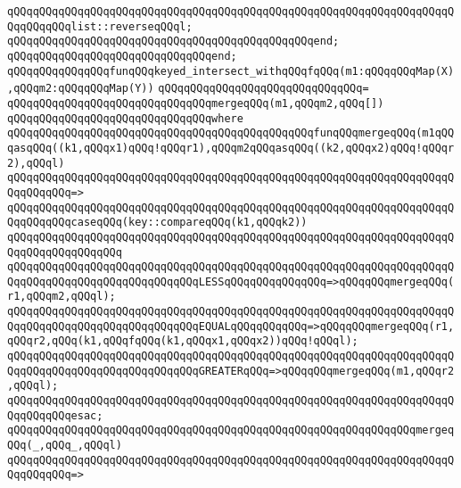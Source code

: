 \verb|qQQqqQQqqQQqqQQqqQQqqQQqqQQqqQQqqQQqqQQqqQQqqQQqqQQqqQQqqQQqqQQqqQQqqQQqqQQqqQQqlist::reverseqQQql;|\newline
\verb|qQQqqQQqqQQqqQQqqQQqqQQqqQQqqQQqqQQqqQQqqQQqqQQqend;|\newline
\verb|qQQqqQQqqQQqqQQqqQQqqQQqqQQqqQQqend;|\newline
\newline
\verb|qQQqqQQqqQQqqQQqfunqQQqkeyed_intersect_withqQQqfqQQq(m1:qQQqqQQqMap(X),qQQqm2:qQQqqQQqMap(Y))|\newline
\verb|qQQqqQQqqQQqqQQqqQQqqQQqqQQqqQQq=|\newline
\verb|qQQqqQQqqQQqqQQqqQQqqQQqqQQqqQQqmergeqQQq(m1,qQQqm2,qQQq[])|\newline
\verb|qQQqqQQqqQQqqQQqqQQqqQQqqQQqqQQqwhere|\newline
\verb|qQQqqQQqqQQqqQQqqQQqqQQqqQQqqQQqqQQqqQQqqQQqqQQqfunqQQqmergeqQQq(m1qQQqasqQQq((k1,qQQqx1)qQQq!qQQqr1),qQQqm2qQQqasqQQq((k2,qQQqx2)qQQq!qQQqr2),qQQql)|\newline
\verb|qQQqqQQqqQQqqQQqqQQqqQQqqQQqqQQqqQQqqQQqqQQqqQQqqQQqqQQqqQQqqQQqqQQqqQQqqQQqqQQq=>|\newline
\verb|qQQqqQQqqQQqqQQqqQQqqQQqqQQqqQQqqQQqqQQqqQQqqQQqqQQqqQQqqQQqqQQqqQQqqQQqqQQqqQQqcaseqQQq(key::compareqQQq(k1,qQQqk2))|\newline
\verb|qQQqqQQqqQQqqQQqqQQqqQQqqQQqqQQqqQQqqQQqqQQqqQQqqQQqqQQqqQQqqQQqqQQqqQQqqQQqqQQqqQQqqQQq|\newline
\verb|qQQqqQQqqQQqqQQqqQQqqQQqqQQqqQQqqQQqqQQqqQQqqQQqqQQqqQQqqQQqqQQqqQQqqQQqqQQqqQQqqQQqqQQqqQQqqQQqqQQqLESSqQQqqQQqqQQqqQQq=>qQQqqQQqmergeqQQq(r1,qQQqm2,qQQql);|\newline
\verb|qQQqqQQqqQQqqQQqqQQqqQQqqQQqqQQqqQQqqQQqqQQqqQQqqQQqqQQqqQQqqQQqqQQqqQQqqQQqqQQqqQQqqQQqqQQqqQQqqQQqEQUALqQQqqQQqqQQq=>qQQqqQQqmergeqQQq(r1,qQQqr2,qQQq(k1,qQQqfqQQq(k1,qQQqx1,qQQqx2))qQQq!qQQql);|\newline
\verb|qQQqqQQqqQQqqQQqqQQqqQQqqQQqqQQqqQQqqQQqqQQqqQQqqQQqqQQqqQQqqQQqqQQqqQQqqQQqqQQqqQQqqQQqqQQqqQQqqQQqGREATERqQQq=>qQQqqQQqmergeqQQq(m1,qQQqr2,qQQql);|\newline
\verb|qQQqqQQqqQQqqQQqqQQqqQQqqQQqqQQqqQQqqQQqqQQqqQQqqQQqqQQqqQQqqQQqqQQqqQQqqQQqqQQqesac;|\newline
\newline
\verb|qQQqqQQqqQQqqQQqqQQqqQQqqQQqqQQqqQQqqQQqqQQqqQQqqQQqqQQqqQQqqQQqmergeqQQq(_,qQQq_,qQQql)|\newline
\verb|qQQqqQQqqQQqqQQqqQQqqQQqqQQqqQQqqQQqqQQqqQQqqQQqqQQqqQQqqQQqqQQqqQQqqQQqqQQqqQQq=>|\newline

